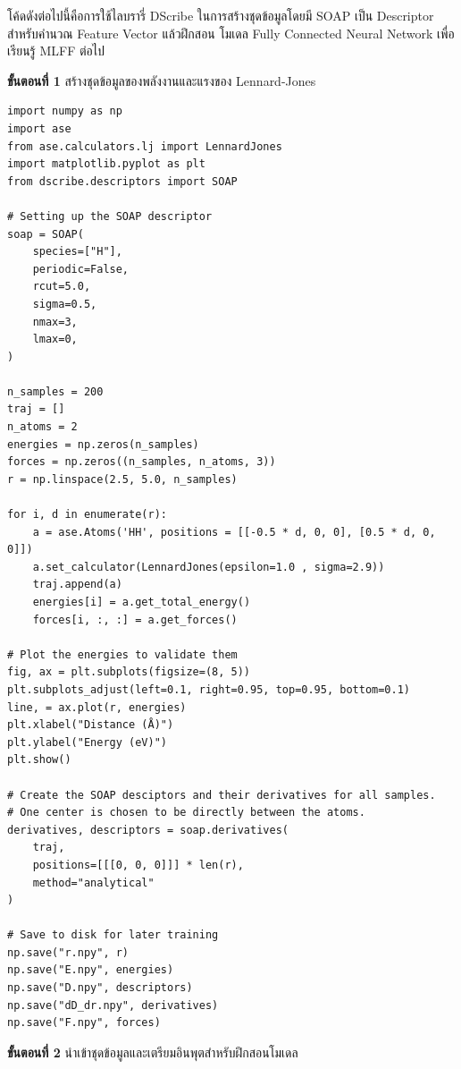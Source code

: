 โค้ดดังต่อไปนี้คือการใช้ไลบรารี่ DScribe ในการสร้างชุดข้อมูลโดยมี SOAP เป็น Descriptor สำหรับคำนวณ Feature Vector แล้วฝึกสอน%
โมเดล Fully Connected Neural Network เพื่อเรียนรู้ MLFF ต่อไป

\textbf{ขั้นตอนที่ 1} สร้างชุดข้อมูลของพลังงานและแรงของ Lennard-Jones

\begin{lstlisting}[style=MyPython]
import numpy as np
import ase
from ase.calculators.lj import LennardJones
import matplotlib.pyplot as plt
from dscribe.descriptors import SOAP

# Setting up the SOAP descriptor
soap = SOAP(
    species=["H"],
    periodic=False,
    rcut=5.0,
    sigma=0.5,
    nmax=3,
    lmax=0,
)

n_samples = 200
traj = []
n_atoms = 2
energies = np.zeros(n_samples)
forces = np.zeros((n_samples, n_atoms, 3))
r = np.linspace(2.5, 5.0, n_samples)

for i, d in enumerate(r):
    a = ase.Atoms('HH', positions = [[-0.5 * d, 0, 0], [0.5 * d, 0, 0]])
    a.set_calculator(LennardJones(epsilon=1.0 , sigma=2.9))
    traj.append(a)
    energies[i] = a.get_total_energy()
    forces[i, :, :] = a.get_forces()
	
# Plot the energies to validate them
fig, ax = plt.subplots(figsize=(8, 5))
plt.subplots_adjust(left=0.1, right=0.95, top=0.95, bottom=0.1)
line, = ax.plot(r, energies)
plt.xlabel("Distance (Å)")
plt.ylabel("Energy (eV)")
plt.show()

# Create the SOAP desciptors and their derivatives for all samples. 
# One center is chosen to be directly between the atoms.
derivatives, descriptors = soap.derivatives(
    traj,
    positions=[[[0, 0, 0]]] * len(r),
    method="analytical"
)

# Save to disk for later training
np.save("r.npy", r)
np.save("E.npy", energies)
np.save("D.npy", descriptors)
np.save("dD_dr.npy", derivatives)
np.save("F.npy", forces)
\end{lstlisting}

\vspace{1em}

\textbf{ขั้นตอนที่ 2} นำเข้าชุดข้อมูลและเตรียมอินพุตสำหรับฝึกสอนโมเดล

